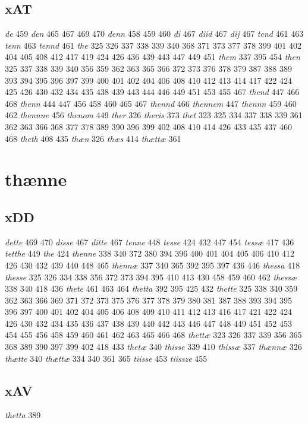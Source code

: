 \documentclass[a4paper,twocolumn]{article}
\begin{document}
\subsection{xAT}
\label{sec:org57b6b41}
\emph{de} 459 \emph{den} 465 467 469 470 \emph{denn} 458 459 460 \emph{di} 467 \emph{diid} 467 \emph{dij} 467 \emph{tend} 461 463 \emph{tenn} 463 \emph{tennd} 461 \emph{the} 325 326 337 338 339 340 368 371 373 377 378 399 401 402 404 405 408 412 417 419 424 426 436 439 443 447 449 451 \emph{them} 337 395 454 \emph{then} 325 337 338 339 340 356 359 362 363 365 366 372 373 376 378 379 387 388 389 393 394 395 396 397 399 400 401 402 404 406 408 410 412 413 414 417 422 424 425 426 430 432 434 435 438 439 443 444 446 449 451 453 455 467 \emph{thend} 447 466 468 \emph{thenn} 444 447 456 458 460 465 467 \emph{thennd} 466 \emph{thennem} 447 \emph{thennn} 459 460 462 \emph{thennne} 456 \emph{thenom} 449 \emph{ther} 326 \emph{theris} 373 \emph{thet} 323 325 334 337 338 339 361 362 363 366 368 377 378 389 390 396 399 402 408 410 414 426 433 435 437 460 468 \emph{theth} 408 435 \emph{thæn} 326 \emph{thæs} 414 \emph{thættæ} 361 
\section{thænne}
\label{sec:org7684a90}
\subsection{xDD}
\label{sec:orgbbdb424}
\emph{dette} 469 470 \emph{disse} 467 \emph{ditte} 467 \emph{tenne} 448 \emph{tesse} 424 432 447 454 \emph{tessæ} 417 436 \emph{tetthe} 449 \emph{the} 424 \emph{thenne} 338 340 372 380 394 396 400 401 404 405 406 410 412 426 430 432 439 440 448 465 \emph{thennæ} 337 340 365 392 395 397 436 446 \emph{thessa} 418 \emph{thesse} 325 326 334 338 356 372 373 394 395 410 413 430 458 459 460 462 \emph{thessæ} 338 340 418 436 \emph{thete} 461 463 464 \emph{thetta} 392 395 425 432 \emph{thette} 325 338 340 359 362 363 366 369 371 372 373 375 376 377 378 379 380 381 387 388 393 394 395 396 397 400 401 402 404 405 406 408 409 410 411 412 413 416 417 421 422 424 426 430 432 434 435 436 437 438 439 440 442 443 446 447 448 449 451 452 453 454 455 456 458 459 460 461 462 463 465 466 468 \emph{thettæ} 323 326 337 339 356 365 368 389 390 397 399 402 418 433 \emph{thetæ} 340 \emph{thisse} 339 410 \emph{thissæ} 337 \emph{thænnæ} 326 \emph{thætte} 340 \emph{thættæ} 334 340 361 365 \emph{tiisse} 453 \emph{tiissze} 455 
\subsection{xAV}
\label{sec:orgd09aa44}
\emph{thetta} 389 
\end{document}
